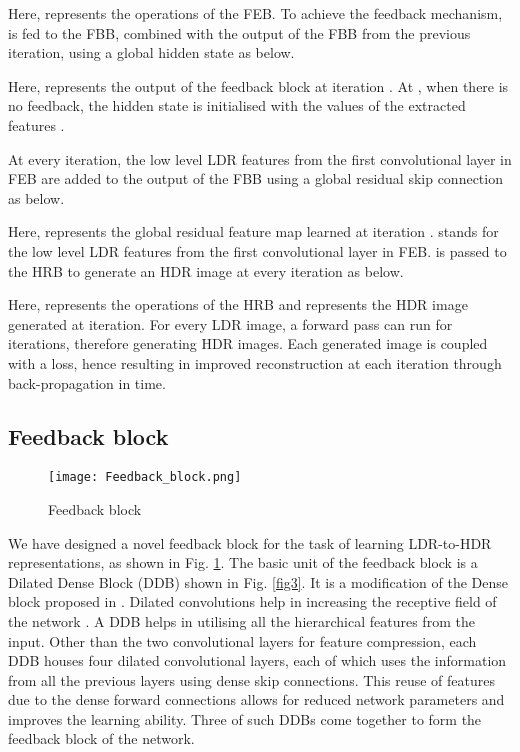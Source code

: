 \documentclass[conference]{IEEEtran}
\begin{document}
Here,  represents the operations of the FEB.
To achieve the feedback mechanism,  is fed to the FBB, combined with the output of the FBB from the previous iteration, using a global hidden state as below. 

Here,  represents the output of the feedback block at iteration . At , when there is no feedback, the hidden state is initialised with the values of the extracted features .

At every iteration, the low level LDR features from the first convolutional layer in FEB are added to the output of the FBB using a global residual skip connection as below.

Here,  represents the global residual feature map learned at iteration .  stands for the low level LDR features from the first convolutional layer in FEB.  is passed to the HRB to generate an HDR image at every iteration as below.

Here,  represents the operations of the HRB and  represents the HDR image generated at  iteration.
For every LDR image, a forward pass can run for  iterations, therefore generating  HDR images. Each generated image is coupled with a loss, hence resulting in improved reconstruction at each iteration through back-propagation in time.

\subsection{Feedback block}

\begin{figure}[htbp]
\centering
\texttt{[image: Feedback\_block.png]}
\caption{Feedback block}
\label{fig2}
\end{figure}

We have designed a novel feedback block for the task of learning LDR-to-HDR representations, as shown in Fig. \ref{fig2}. 
The basic unit of the feedback block is a Dilated Dense Block (DDB) shown in Fig. \ref{fig3}. It is a modification of the Dense block proposed in \cite{huang2017densely}. Dilated convolutions help in increasing the receptive field of the network \cite{yu2015multi}. 
A DDB helps in utilising all the hierarchical features from the input. 
Other than the two  convolutional layers for feature compression, each DDB houses four dilated  convolutional layers, each of which uses the information from all the previous layers using dense skip connections. This reuse of features due to the dense forward connections allows for reduced network parameters and improves the learning ability. Three of such DDBs come together to form the feedback block of the network.
\end{document}
